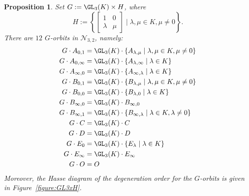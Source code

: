 \documentclass[12pt]{amsart}
\newtheorem{proposition}[theorem]{\bf Proposition}
\newcommand{\field}{K}
\begin{document}
\begin{proposition} \label{prop:GL3xH-orbits}
Set $G:=\GL_3(\field)\times H$, where 
\[H:=\left\{ \begin{bmatrix}1&0 \\ \lambda& \mu\end{bmatrix} 
\mid \lambda,\mu\in \field, \mu\neq 0 \right\}.\]
There are $12$ $G$-orbits in $\mathcal{N}_{3,2}$, namely: 
\begin{align*}
G\cdot A_{0,1}&=\GL_3(\field)\cdot 
\{A_{\lambda,\mu}\mid \lambda,\mu\in \field, \mu \neq 0\}\\
G\cdot A_{0,\infty}&=\GL_3(\field)\cdot \{A_{\lambda,\infty}
\mid \lambda\in \field\} \\
G\cdot A_{\infty,0}&=\GL_3(\field)\cdot 
\{A_{\infty,\lambda}\mid \lambda\in\field\} \\
G\cdot B_{0,1}&=\GL_3(\field)\cdot 
\{B_{\lambda,\mu}\mid \lambda,\mu\in\field, \mu\neq 0\} \\
G\cdot B_{0,0}&=\GL_3(\field)\cdot 
\{B_{\lambda,0}\mid \lambda\in \field\} \\
G\cdot B_{\infty,0}&=\GL_3(\field)\cdot B_{\infty,0} \\ 
G\cdot B_{\infty,1}&=\GL_3(\field)\cdot 
\{B_{\infty,\lambda}\mid \lambda\in \field, \lambda\neq 0\} \\
G\cdot C&=\GL_3(\field)\cdot C\\ 
G\cdot D&=\GL_3(\field)\cdot D\\
G\cdot E_0&=\GL_3(\field)\cdot \{E_{\lambda}\mid \lambda\in \field\} \\
G\cdot E_\infty&=\GL_3(\field)\cdot E_\infty \\
G\cdot O&= O
\end{align*}
Moreover, the Hasse diagram of the degeneration order for the 
$G$-orbits is given in Figure~\ref{figure:GL3xH}. 
\end{proposition}
\end{document}
